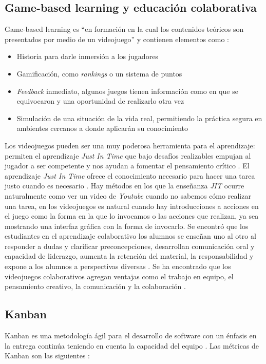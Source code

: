 \subsection{Game-based learning y educación colaborativa}
Game-based learning es “en formación en la cual los contenidos teóricos son presentados por medio de un videojuego” \cite{gamelearn2014a} y contienen elementos como \cite{gamelearn2017a}:
\begin{itemize}
    \item Historia para darle inmersión a los jugadores
    \item Gamificación, como \textit{rankings} o un sistema de puntos
    \item \textit{Feedback} inmediato, algunos juegos tienen información como en que se equivocaron y una oportunidad de realizarlo otra vez
    \item Simulación de una situación de la vida real, permitiendo la práctica segura en ambientes cercanos a donde aplicarán su conocimiento
\end{itemize}

Los videojuegos pueden ser una muy poderosa herramienta para el aprendizaje: permiten el aprendizaje \textit{Just In Time} que bajo desafíos realizables empujan al 
jugador a ser competente y nos ayudan a fomentar el pensamiento crítico \cite{levasseur-a}. 
El aprendizaje \textit{Just In Time} ofrece el conocimiento necesario para hacer una tarea justo cuando es necesario \cite{unknown2017a}. 
Hay métodos en los que la enseñanza \textit{JIT} ocurre naturalmente como ver un video de \textit{Youtube} cuando no sabemos cómo realizar una tarea, 
en los videojuegos es natural cuando hay introducciones a acciones en el juego como la forma en la que lo invocamos o las acciones que realizan, 
ya sea mostrando una interfaz gráfica con la forma de invocarlo.
Se encontró que los estudiantes en el aprendizaje colaborativo los alumnos se enseñan uno al otro al responder a dudas y 
clarificar preconcepciones, desarrollan comunicación oral y capacidad de liderazgo, aumenta la retención del material, 
la responsabilidad y expone a los alumnos a perspectivas diversas \cite{university-a}.
Se ha encontrado que los videojuegos colaborativos agregan ventajas como el trabajo en equipo, el pensamiento creativo, 
la comunicación y la colaboración \cite{romano-a}.

\subsection{Kanban}
Kanban es una metodología ágil para el desarrollo de software con un énfasis 
en la entrega continúa teniendo en cuenta la capacidad del equipo \cite{romano-a}. 
Las métricas de Kanban son las siguientes \cite{najera2018a}:

